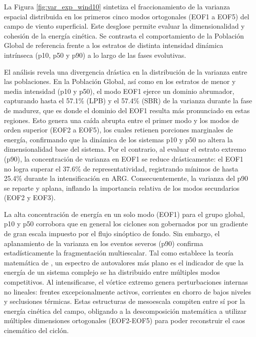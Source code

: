 La Figura \ref{fig:var_exp_wind10} sintetiza el fraccionamiento de la varianza espacial distribuida en los primeros cinco modos ortogonales (EOF1 a EOF5) del campo de viento superficial. Este desglose permite evaluar la dimensionalidad y cohesión de la energía cinética. Se contrasta el comportamiento de la Población Global de referencia frente a los estratos de distinta intensidad dinámica intrínseca (p10, p50 y p90) a lo largo de las fases evolutivas.

El análisis revela una divergencia drástica en la distribución de la varianza entre las poblaciones. En la Población Global, así como en los estratos de menor y media intensidad (p10 y p50), el modo EOF1 ejerce un dominio abrumador, capturando hasta el 57.1\% (LPB) y el 57.4\% (SBR) de la varianza durante la fase de madurez, que es donde el dominio del EOF1 resulta m\'as pronunciado en estas regiones. Esto genera una ca\'ida abrupta entre el primer modo y los modos de orden superior (EOF2 a EOF5), los cuales retienen porciones marginales de energía, confirmando que la dinámica de los sistemas p10 y p50 no altera la dimensionalidad base del sistema. Por el contrario, al evaluar el estrato extremo (p90), la concentración de varianza en EOF1 se reduce drásticamente: el EOF1 no logra superar el 37.6\% de representatividad, registrando mínimos de hasta 25.4\% durante la intensificación en ARG. Consecuentemente, la varianza del p90 se reparte y aplana, inflando la importancia relativa de los modos secundarios (EOF2 y EOF3).

La alta concentración de energía en un solo modo (EOF1) para el grupo global, p10 y p50 corrobora que en general los ciclones son gobernados por un gradiente de gran escala impuesto por el flujo sinóptico de fondo. Sin embargo, el aplanamiento de la varianza en los eventos severos (p90) confirma estadísticamente la fragmentación multiescalar. Tal como establece la teoría matemática de \citet{hannachi2007empirical}, un espectro de autovalores más plano es el indicador de que la energía de un sistema complejo se ha distribuido entre múltiples modos competitivos. Al intensificarse, el vórtice extremo genera perturbaciones internas no lineales: frentes excepcionalmente activos, corrientes en chorro de bajos niveles y seclusiones térmicas. Estas estructuras de mesoescala compiten entre sí por la energía cinética del campo, obligando a la descomposición matemática a utilizar múltiples dimensiones ortogonales (EOF2-EOF5) para poder reconstruir el caos cinemático del ciclón.

